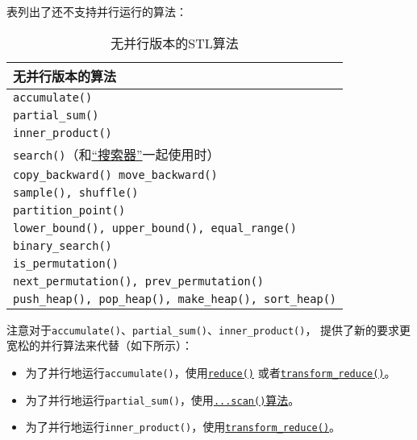 表列出了还不支持并行运行的算法：
\begin{table}[ht]
    \centering
    \begin{tabular}{l}
        \hline
        \textbf{无并行版本的算法}                                              \\
        \hline
        \texttt{accumulate()}                                          \\
        \texttt{partial\_sum()}                                        \\
        \texttt{inner\_product()}                                      \\
        \texttt{search()}（和\hyperref[ch24]{“搜索器”}一起使用时）                \\
        \texttt{copy\_backward() move\_backward()}                     \\
        \texttt{sample(), shuffle()}                                   \\
        \texttt{partition\_point()}                                    \\
        \texttt{lower\_bound(), upper\_bound(), equal\_range()}        \\
        \texttt{binary\_search()}                                      \\
        \texttt{is\_permutation()}                                     \\
        \texttt{next\_permutation(), prev\_permutation()}              \\
        \texttt{push\_heap(), pop\_heap(), make\_heap(), sort\_heap()} \\
        \hline
    \end{tabular}
    \caption{无并行版本的STL算法}
    \label{t22.3}
\end{table}

注意对于\texttt{accumulate()}、\texttt{partial\_sum()}、\texttt{inner\_product()}，
提供了新的要求更宽松的并行算法来代替（如下所示）：
\begin{itemize}
    \item 为了并行地运行\texttt{accumulate()}，使用\hyperref[ch23.2.1]{\texttt{reduce()}}
    或者\hyperref[ch23.2.2]{\texttt{transform\_reduce()}}。
    \item 为了并行地运行\texttt{partial\_sum()}，使用\hyperref[ch23.2.3]{\texttt{...scan()}算法}。
    \item 为了并行地运行\texttt{inner\_product()}，使用\hyperref[ch23.2.2.2]{\texttt{transform\_reduce()}}。
\end{itemize}

